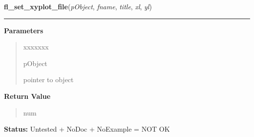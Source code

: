 \hspace{.8\funcindent}\begin{boxedminipage}{\funcwidth}

    \raggedright \textbf{fl\_set\_xyplot\_file}(\textit{pObject}, \textit{fname}, \textit{title}, \textit{xl}, \textit{yl})

    \vspace{-1.5ex}

    \rule{\textwidth}{0.5\fboxrule}
\setlength{\parskip}{2ex}
\setlength{\parskip}{1ex}
      \textbf{Parameters}
      \vspace{-1ex}

      \begin{quote}
        \begin{Ventry}{xxxxxxx}

          \item[pObject]

          pointer to object

        \end{Ventry}

      \end{quote}

      \textbf{Return Value}
    \vspace{-1ex}

      \begin{quote}
      num

      \end{quote}

\textbf{Status:} Untested + NoDoc + NoExample = NOT OK



    \end{boxedminipage}

    \label{xformslib:library:fl_insert_xyplot_data}

    \vspace{0.5ex}

